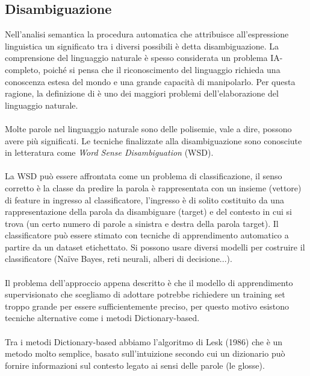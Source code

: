 \documentclass{article}
\theoremstyle{plain}
\theoremstyle{definition}
\begin{document}
\subsection{Disambiguazione}
Nell'analisi semantica la procedura automatica che attribuisce all'espressione linguistica un significato tra i diversi possibili è detta disambiguazione.
La comprensione del linguaggio naturale è spesso considerata un problema IA-completo, poiché si pensa che il riconoscimento del linguaggio richieda una conoscenza estesa del mondo e una grande capacità di manipolarlo. Per questa ragione, la definizione di  è uno dei maggiori problemi dell'elaborazione del linguaggio naturale.\footnotemark
{}
\\
\\
Molte parole nel linguaggio naturale sono delle polisemie, vale a dire, possono avere più significati. Le tecniche finalizzate alla disambiguazione sono conosciute in letteratura come \textit{Word Sense Disambiguation} (WSD).
\\
\\
La WSD può essere affrontata come un problema di classificazione, il senso corretto è la classe da predire la parola è rappresentata con un insieme (vettore) di feature in ingresso al classificatore, l'ingresso è di solito costituito da una rappresentazione della parola da disambiguare (target) e del contesto in cui si trova (un certo numero di parole a sinistra e destra della parola target). Il classificatore può essere stimato con tecniche di apprendimento automatico a partire da un dataset etichettato. Si possono usare diversi modelli per costruire il classificatore (Naïve Bayes, reti neurali, alberi di decisione...).
\\
\\
Il problema dell'approccio appena descritto è che il modello di apprendimento supervisionato che scegliamo di adottare potrebbe richiedere un training set troppo grande per essere sufficientemente preciso, per questo motivo esistono tecniche alternative come i metodi Dictionary-based.
\\
\\
Tra i metodi Dictionary-based abbiamo l'algoritmo di Lesk (1986) che è un metodo molto semplice, basato sull'intuizione secondo cui un dizionario può fornire informazioni sul contesto legato ai sensi delle parole (le glosse).  

 
\end{document}
